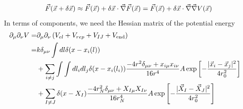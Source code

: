 \documentclass[nofootinbib,preprint,endfloats]{revtex4} %
\begin{document}
\[\vec{F} (\vec{x}+\delta \vec{x}) \approx \vec{F} (\vec{x})+\delta \vec{x}\cdot  \vec{\nabla} \vec{F} (\vec{x}) = \vec{F} (\vec{x})+\delta \vec{x}\cdot  \vec{\nabla} \vec{\nabla} V (\vec{x})\]
In terms of components, we need the Hessian matrix of the potential energy
\begin{align}
    \partial_\mu \partial_\nu V =&  \partial_\mu \partial_\nu \left(V_{el}+V_{rep} + V_{IJ}+V_\mathrm{end}\right) \cr
    =& k \delta_{\mu\nu}\int dl \delta(x-x_i(l)) \cr
    &+ 
    \sum_{i\ne j} \int \int dl_i dl_j \delta(x-x_i(l_i))\frac{-4r^2\delta_{\mu\nu}+x_{i\mu}x_{i\nu}}{16r^4}
    A \exp\left[- {|\vec{x}_i-\vec{x}_j|^2 \over 4 r_0^2}\right]\cr
    &+ \sum_{I\ne J}\delta(x-X_I)\frac{-4r_N^2\delta_{\mu\nu}+X_{I\mu}X_{I\nu}}{16r_N^4}
    A \exp\left[- {|\vec{X}_I-\vec{X}_J|^2 \over 4 r_0^2}\right]
\end{align}




\newpage
\newpage
\end{document}
